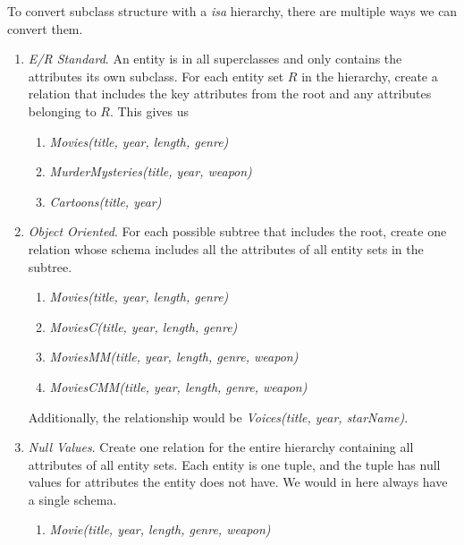 \documentclass{article}
\begin{document}
    \begin{theorem}
      To convert subclass structure with a \textit{isa} hierarchy, there are multiple ways we can convert them. 
      \begin{enumerate}
        \item \textit{E/R Standard}. An entity is in all superclasses and only contains the attributes its own subclass. For each entity set $R$ in the hierarchy, create a relation that includes the key attributes from the root and any attributes belonging to $R$. This gives us 
          \begin{enumerate}
            \item \textit{Movies(title, year, length, genre)}
            \item \textit{MurderMysteries(title, year, weapon)}
            \item \textit{Cartoons(title, year)}
          \end{enumerate}
        \item \textit{Object Oriented}. For each possible subtree that includes the root, create one relation whose schema includes all the attributes of all entity sets in the subtree.
          \begin{enumerate}
            \item \textit{Movies(title, year, length, genre)} 
            \item \textit{MoviesC(title, year, length, genre)} 
            \item \textit{MoviesMM(title, year, length, genre, weapon)}
            \item \textit{MoviesCMM(title, year, length, genre, weapon)}
          \end{enumerate}
          Additionally, the relationship would be \textit{Voices(title, year, starName)}. 
        \item \textit{Null Values}. Create one relation for the entire hierarchy containing all attributes of all entity sets. Each entity is one tuple, and the tuple has null values for attributes the entity does not have. We would in here always have a single schema. 
          \begin{enumerate}
            \item \textit{Movie(title, year, length, genre, weapon)}
          \end{enumerate}
      \end{enumerate}
    \end{theorem}
\end{document}

